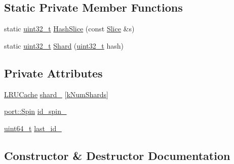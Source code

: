 \subsection*{Static Private Member Functions}
\begin{DoxyCompactItemize}
\item 
static \hyperlink{stdint_8h_a435d1572bf3f880d55459d9805097f62}{uint32\+\_\+t} \hyperlink{classleveldb_1_1anonymous__namespace_02cache_8cc_03_1_1_sharded_l_r_u_cache_ad26bfc7ac1209a9554b64e6037da48d3}{Hash\+Slice} (const \hyperlink{classleveldb_1_1_slice}{Slice} \&s)
\item 
static \hyperlink{stdint_8h_a435d1572bf3f880d55459d9805097f62}{uint32\+\_\+t} \hyperlink{classleveldb_1_1anonymous__namespace_02cache_8cc_03_1_1_sharded_l_r_u_cache_aaf235de6023269068590334e20177366}{Shard} (\hyperlink{stdint_8h_a435d1572bf3f880d55459d9805097f62}{uint32\+\_\+t} hash)
\end{DoxyCompactItemize}
\subsection*{Private Attributes}
\begin{DoxyCompactItemize}
\item 
\hyperlink{classleveldb_1_1anonymous__namespace_02cache_8cc_03_1_1_l_r_u_cache}{L\+R\+U\+Cache} \hyperlink{classleveldb_1_1anonymous__namespace_02cache_8cc_03_1_1_sharded_l_r_u_cache_af9dd0c7a6b50964fd1a4c23b6f7dcf50}{shard\+\_\+} \mbox{[}\hyperlink{namespaceleveldb_1_1anonymous__namespace_02cache_8cc_03_aca0255908fd5069b4420e4f02d25bd1b}{k\+Num\+Shards}\mbox{]}
\item 
\hyperlink{namespaceleveldb_1_1port_a3017c82209c2da44f142ef633e012149}{port\+::\+Spin} \hyperlink{classleveldb_1_1anonymous__namespace_02cache_8cc_03_1_1_sharded_l_r_u_cache_a6ef3f39228376c7cc2cca4eed9ba8754}{id\+\_\+spin\+\_\+}
\item 
\hyperlink{stdint_8h_aaa5d1cd013383c889537491c3cfd9aad}{uint64\+\_\+t} \hyperlink{classleveldb_1_1anonymous__namespace_02cache_8cc_03_1_1_sharded_l_r_u_cache_aa3ce6feff0c78135bea246466410efe3}{last\+\_\+id\+\_\+}
\end{DoxyCompactItemize}


\subsection{Constructor \& Destructor Documentation}
\hypertarget{classleveldb_1_1anonymous__namespace_02cache_8cc_03_1_1_sharded_l_r_u_cache_a1779b7d8dee1445e56ffbb2b31266196}{}
